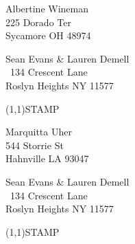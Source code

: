 \documentclass[12pt]{article}
\begin{document}
\begin{center} \begin{Huge} \vspace*{\fill}
Albertine Wineman\\
225 Dorado Ter\\
Sycamore OH 48974\\
\vspace{\fill} \end{Huge} \end{center}

\clearpage

\begin{minipage}{.5\linewidth} \noindent
Sean Evans \& Lauren Demell\\\ 
134 Crescent Lane\\ 
Roslyn Heights NY 11577
\end{minipage}
\begin{minipage}{.5\linewidth \hspace{-.2in} \vspace{-.3in}}
\begin{flushright}
\framebox(1,1){STAMP}
\end{flushright}
\end{minipage}

\begin{center} \begin{Huge} \vspace*{\fill}
Marquitta Uher\\
544 Storrie St\\
Hahnville LA 93047\\
\vspace{\fill} \end{Huge} \end{center}

\clearpage

\begin{minipage}{.5\linewidth} \noindent
Sean Evans \& Lauren Demell\\\ 
134 Crescent Lane\\ 
Roslyn Heights NY 11577
\end{minipage}
\begin{minipage}{.5\linewidth \hspace{-.2in} \vspace{-.3in}}
\begin{flushright}
\framebox(1,1){STAMP}
\end{flushright}
\end{minipage}
\end{document}
